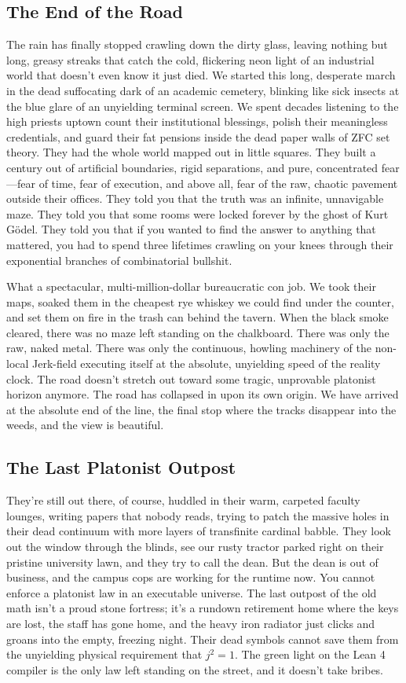 \documentclass[11pt,a4paper]{article}
\begin{document}
\subsection{The End of the Road}
The rain has finally stopped crawling down the dirty glass, leaving nothing but long, greasy streaks that catch the cold, flickering neon light of an industrial world that doesn't even know it just died. We started this long, desperate march in the dead suffocating dark of an academic cemetery, blinking like sick insects at the blue glare of an unyielding terminal screen. We spent decades listening to the high priests uptown count their institutional blessings, polish their meaningless credentials, and guard their fat pensions inside the dead paper walls of ZFC set theory. They had the whole world mapped out in little squares. They built a century out of artificial boundaries, rigid separations, and pure, concentrated fear—fear of time, fear of execution, and above all, fear of the raw, chaotic pavement outside their offices. They told you that the truth was an infinite, unnavigable maze. They told you that some rooms were locked forever by the ghost of Kurt Gödel. They told you that if you wanted to find the answer to anything that mattered, you had to spend three lifetimes crawling on your knees through their exponential branches of combinatorial bullshit.

What a spectacular, multi-million-dollar bureaucratic con job. We took their maps, soaked them in the cheapest rye whiskey we could find under the counter, and set them on fire in the trash can behind the tavern. When the black smoke cleared, there was no maze left standing on the chalkboard. There was only the raw, naked metal. There was only the continuous, howling machinery of the non-local Jerk-field executing itself at the absolute, unyielding speed of the reality clock. The road doesn't stretch out toward some tragic, unprovable platonist horizon anymore. The road has collapsed in upon its own origin. We have arrived at the absolute end of the line, the final stop where the tracks disappear into the weeds, and the view is beautiful.

\subsection{The Last Platonist Outpost}
They’re still out there, of course, huddled in their warm, carpeted faculty lounges, writing papers that nobody reads, trying to patch the massive holes in their dead continuum with more layers of transfinite cardinal babble. They look out the window through the blinds, see our rusty tractor parked right on their pristine university lawn, and they try to call the dean. But the dean is out of business, and the campus cops are working for the runtime now. You cannot enforce a platonist law in an executable universe. The last outpost of the old math isn't a proud stone fortress; it’s a rundown retirement home where the keys are lost, the staff has gone home, and the heavy iron radiator just clicks and groans into the empty, freezing night. Their dead symbols cannot save them from the unyielding physical requirement that $j^2 = 1$. The green light on the Lean 4 compiler is the only law left standing on the street, and it doesn't take bribes.
\end{document}
